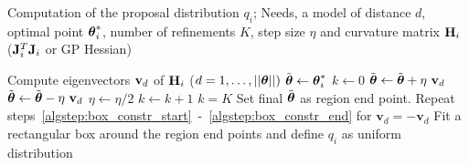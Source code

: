 \begin{algorithm}[!ht]
	\caption{Computation of the proposal distribution $q_i$; Needs, a model of distance $d$, optimal point $\boldsymbol{\theta}_i^*$, number of refinements $K$, step size $\eta$ and curvature matrix $\mathbf{H}_i$ ($\mathbf{J}_i^T\mathbf{J}_i $ or GP Hessian)}\label{alg:region_construction}
	\begin{algorithmic}[1]
	\State Compute eigenvectors $\mathbf{v}_{d}$ of $\mathbf{H}_i$ {\scriptsize ($d = 1,\ldots,||\boldsymbol{\theta} ||)$}
		\State $\Tilde{\boldsymbol{\theta}} \gets \boldsymbol{\theta}_i^*$ \label{algstep:box_constr_start}
		\State $k \gets 0$
		\Repeat
        	\Repeat
                \State $\Tilde{\boldsymbol{\theta}} \gets \Tilde{\boldsymbol{\theta}} + \eta \ \mathbf{v}_{d}$ 
        	\State $\Tilde{\boldsymbol{\theta}} \gets \Tilde{\boldsymbol{\theta}} - \eta \ \mathbf{v}_{d}$
        	\State $\eta \gets \eta/2$ 
        	\State $k \gets k + 1$
    	\Until $k = K$
    	\State Set final $\Tilde{\boldsymbol{\theta}}$ as region end point. \label{algstep:box_constr_end}
    	\State Repeat steps~\ref{algstep:box_constr_start}~-~\ref{algstep:box_constr_end} for $\mathbf{v}_{d} = - \mathbf{v}_{d}$
	\EndFor
	\State Fit a rectangular box around the region end points and define $q_i$ as uniform distribution
	\end{algorithmic}
\end{algorithm}



